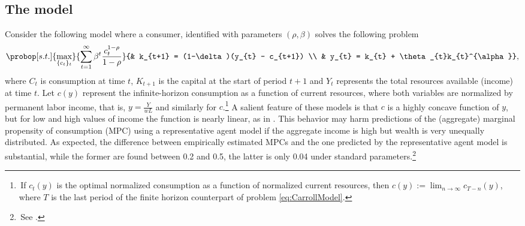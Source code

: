 \documentclass[english, a4paper, 12pt]{article}
\begin{document}
\subsection{The model}
Consider the following model where a consumer, identified with parameters $(\rho, \beta)$ solves the following problem
	\begin{equation} \label{eq:CarrollModel}
		\probop[s.t.]{\max_{\{c_{t}\}_{t}}}{\sum_{t=1}^{\infty} \beta^{t}\frac{c_{t}^{1-\rho}}{1-\rho}}
					{&	k_{t+1} = (1-\delta)(y_{t} - c_{t+1})	\\
					&	y_{t} = k_{t} + \theta_{t}k_{t}^{\alpha}},
	\end{equation}
where $C_{t}$ is consumption at time $t$, $K_{t+1}$ is the capital at the start of period $t+1$ and $Y_{t}$ represents the total resources available (income) at time $t$. Let $c(y)$ represent the infinite-horizon consumption as a function of current resources, where both variables are normalized by permanent labor income, that is, $y = \frac{Y}{wL}$ and similarly for $c$.\footnote{\,If $c_{t}(y)$ is the optimal normalized consumption as a function of normalized current resources, then $c(y) := \lim_{n \to \infty} c_{T-n}(y)$, where $T$ is the last period of the finite horizon counterpart of problem \eqref{eq:CarrollModel}.} A salient feature of these models is that $c$ is a highly concave function of $y$, but for low and high values of income the function is nearly linear, as in . This behavior may harm predictions of the (aggregate) marginal propensity of consumption (MPC) using a representative agent model if the aggregate income is high but wealth is very unequally distributed. As expected, the difference between empirically estimated MPCs and the one predicted by the representative agent model is substantial, while the former are found between 0.2 and 0.5, the latter is only 0.04 under standard parameters.\footnote{\,See \cite{CarrollRequiem}.}
\end{document}
